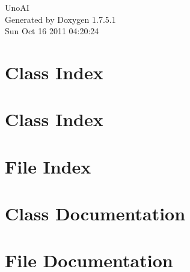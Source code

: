 \documentclass[a4paper]{book}
\begin{document}
\hypersetup{pageanchor=false,citecolor=blue}
\begin{titlepage}
\vspace*{7cm}
\begin{center}
{\Large \-Uno\-A\-I }\\
\vspace*{1cm}
{\large \-Generated by Doxygen 1.7.5.1}\\
\vspace*{0.5cm}
{\small Sun Oct 16 2011 04:20:24}\\
\end{center}
\end{titlepage}
\clearemptydoublepage
{}
\tableofcontents
\clearemptydoublepage
{}
\hypersetup{pageanchor=true,citecolor=blue}
\chapter{\-Class \-Index}

\chapter{\-Class \-Index}

\chapter{\-File \-Index}

\chapter{\-Class \-Documentation}




\chapter{\-File \-Documentation}













\printindex
\end{document}
